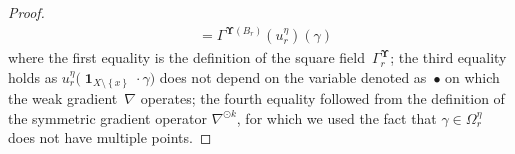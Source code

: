\documentclass[11pt,letterpaper]{amsart}
\newcommand{\rep}[1]{\hat #1}
\renewcommand{\complement}{\mathrm{c}}
\newcommand{\set}[1]{\left\{#1\right\}}							%
\newcommand{\paren}[1]{\left(#1\right)}							%
\newcommand{\tparen}[1]{\big({#1}\big)}
\DeclareMathOperator{\car}{\mathbf 1}
\newcommand{\comma}{\,\,\mathrm{,}\;\,}
\newcommand{\cdc}{\Gamma}
\newcommand{\dUpsilon}{{\mathbf \Upsilon}}
\renewcommand{\1}{\mathbf 1}
\numberwithin{equation}{section}
\theoremstyle{plain}
\theoremstyle{definition}
\theoremstyle{remark}
\begin{document}
\begin{proof}
\begin{align*}
&=  \cdc^{\dUpsilon(B_r)}(u_{r}^\eta)(\gamma)
\end{align*}
where the first equality is the definition of the square field~$\cdc^\dUpsilon_r$;  the third equality holds as $u^\eta_{r}\tparen{\car_{X\setminus\set{x}}\cdot\gamma}$ does not depend on the variable denoted as~$\bullet$ on which the weak gradient~$\nabla$ operates; the fourth equality followed from the definition of the symmetric gradient operator $\nabla^{\odot k}$, for which we used the fact that $\gamma \in \Omega_r^\eta$ does not have multiple points. 
%

\end{proof}
\end{document}
